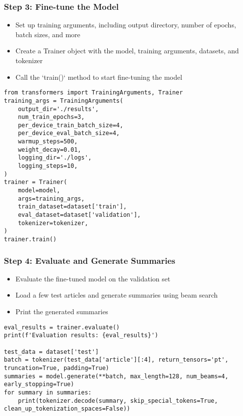 \begin{frame}[fragile]\frametitle{Step 3: Fine-tune the Model}

  \begin{itemize}
    \item Set up training arguments, including output directory, number of epochs, batch sizes, and more
    \item Create a Trainer object with the model, training arguments, datasets, and tokenizer
    \item Call the `train()` method to start fine-tuning the model
  \end{itemize}
  \begin{lstlisting}
from transformers import TrainingArguments, Trainer
training_args = TrainingArguments(
    output_dir='./results',
    num_train_epochs=3,
    per_device_train_batch_size=4,
    per_device_eval_batch_size=4,
    warmup_steps=500,
    weight_decay=0.01,
    logging_dir='./logs',
    logging_steps=10,
)
trainer = Trainer(
    model=model,
    args=training_args,
    train_dataset=dataset['train'],
    eval_dataset=dataset['validation'],
    tokenizer=tokenizer,
)
trainer.train()
  \end{lstlisting}

\end{frame}

\begin{frame}[fragile]\frametitle{Step 4: Evaluate and Generate Summaries}

  \begin{itemize}
    \item Evaluate the fine-tuned model on the validation set
    \item Load a few test articles and generate summaries using beam search
    \item Print the generated summaries
  \end{itemize}
  
  \begin{lstlisting}
eval_results = trainer.evaluate()
print(f'Evaluation results: {eval_results}')

test_data = dataset['test']
batch = tokenizer(test_data['article'][:4], return_tensors='pt', truncation=True, padding=True)
summaries = model.generate(**batch, max_length=128, num_beams=4, early_stopping=True)
for summary in summaries:
    print(tokenizer.decode(summary, skip_special_tokens=True, clean_up_tokenization_spaces=False))
  \end{lstlisting}

\end{frame}

